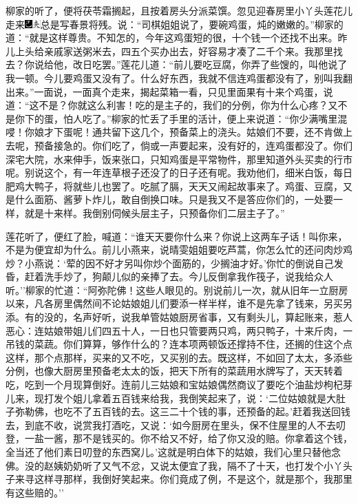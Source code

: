 柳家的听了，便将茯苓霜搁起，且按着房头分派菜馔。忽见迎春房里小丫头莲花儿走来{\includegraphics[width=3mm]{../Images/00003}\includegraphics[width=3mm]{../Images/00012}\footnotesize \kaishu 总是写春景将残。}说：``司棋姐姐说了，要碗鸡蛋，炖的嫩嫩的。''柳家的道：``就是这样尊贵。不知怎的，今年这鸡蛋短的很，十个钱一个还找不出来。昨儿上头给亲戚家送粥米去，四五个买办出去，好容易才凑了二千个来。我那里找去？你说给他，改日吃罢。''莲花儿道：``前儿要吃豆腐，你弄了些馊的，叫他说了我一顿。今儿要鸡蛋又没有了。什么好东西，我就不信连鸡蛋都没有了，别叫我翻出来。''一面说，一面真个走来，揭起菜箱一看，只见里面果有十来个鸡蛋，说道：``这不是？你就这么利害！吃的是主子的，我们的分例，你为什么心疼？又不是你下的蛋，怕人吃了。''柳家的忙丢了手里的活计，便上来说道：``你少满嘴里混唚！你娘才下蛋呢！通共留下这几个，预备菜上的浇头。姑娘们不要，还不肯做上去呢，预备接急的。你们吃了，倘或一声要起来，没有好的，连鸡蛋都没了。你们深宅大院，水来伸手，饭来张口，只知鸡蛋是平常物件，那里知道外头买卖的行市呢。别说这个，有一年连草根子还没了的日子还有呢。我劝他们，细米白饭，每日肥鸡大鸭子，将就些儿也罢了。吃腻了膈，天天又闹起故事来了。鸡蛋、豆腐，又是什么面筋、酱萝卜炸儿，敢自倒换口味。只是我又不是答应你们的，一处要一样，就是十来样。我倒别伺候头层主子，只预备你们二层主子了。''

莲花听了，便红了脸，喊道：``谁天天要你什么来？你说上这两车子话！叫你来，不是为便宜却为什么。前儿小燕来，说晴雯姐姐要吃芦蒿，你怎么忙的还问肉炒鸡炒？小燕说：`荤的因不好才另叫你炒个面筋的，少搁油才好。'你忙的倒说自己发昏，赶着洗手炒了，狗颠儿似的亲捧了去。今儿反倒拿我作筏子，说我给众人听。''柳家的忙道：``阿弥陀佛！这些人眼见的。别说前儿一次，就从旧年一立厨房以来，凡各房里偶然间不论姑娘姐儿们要添一样半样，谁不是先拿了钱来，另买另添。有的没的，名声好听，说我单管姑娘厨房省事，又有剩头儿，算起账来，惹人恶心：连姑娘带姐儿们四五十人，一日也只管要两只鸡，两只鸭子，十来斤肉，一吊钱的菜蔬。你们算算，够作什么的？连本项两顿饭还撑持不住，还搁的住这个点这样，那个点那样，买来的又不吃，又买别的去。既这样，不如回了太太，多添些分例，也像大厨房里预备老太太的饭，把天下所有的菜蔬用水牌写了，天天转着吃，吃到一个月现算倒好。连前儿三姑娘和宝姑娘偶然商议了要吃个油盐炒枸杞芽儿来，现打发个姐儿拿着五百钱来给我，我倒笑起来了，说：`二位姑娘就是大肚子弥勒佛，也吃不了五百钱的去。这三二十个钱的事，还预备的起。'赶着我送回钱去，到底不收，说赏我打酒吃，又说：`如今厨房在里头，保不住屋里的人不去叨登，一盐一酱，那不是钱买的。你不给又不好，给了你又没的赔。你拿着这个钱，全当还了他们素日叨登的东西窝儿。'这就是明白体下的姑娘，我们心里只替他念佛。没的赵姨奶奶听了又气不忿，又说太便宜了我，隔不了十天，也打发个小丫头子来寻这样寻那样，我倒好笑起来。你们竟成了例，不是这个，就是那个，我那里有这些赔的。''

